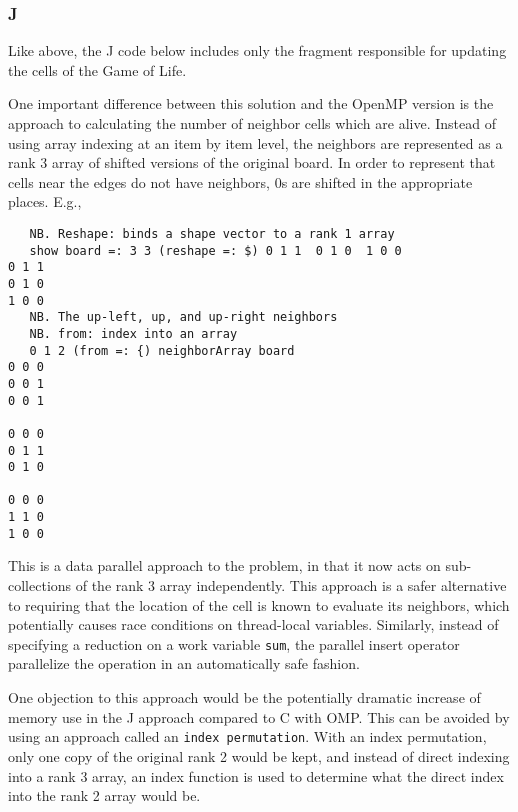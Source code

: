 \subsubsection{J}
Like above, the J code below includes only the fragment responsible for updating the cells of the Game of Life. 

\begin{singlespacing}
\begin{small}

\end{small}
\end{singlespacing}

One important difference between this solution and the OpenMP version is 
the approach to calculating the number of neighbor cells which are alive.
Instead of using array indexing at an item by item level, 
the neighbors are represented as a rank 3 array of shifted versions of the original board. 
In order to represent that cells near the edges do not have neighbors, 
0s are shifted in the appropriate places.
E.g.,

\begin{singlespacing}
\begin{small}
\begin{verbatim}
   NB. Reshape: binds a shape vector to a rank 1 array
   show board =: 3 3 (reshape =: $) 0 1 1  0 1 0  1 0 0
0 1 1
0 1 0
1 0 0
   NB. The up-left, up, and up-right neighbors
   NB. from: index into an array
   0 1 2 (from =: {) neighborArray board 
0 0 0
0 0 1
0 0 1

0 0 0
0 1 1
0 1 0

0 0 0
1 1 0
1 0 0
\end{verbatim}
\end{small}
\end{singlespacing}

This is a data parallel approach to the problem,
in that it now acts on sub-collections of the rank 3 array independently. 
This approach is a safer alternative to requiring 
that the location of the cell is known to evaluate its neighbors, 
which potentially causes race conditions on thread-local variables.
Similarly, instead of specifying a reduction on a work variable \texttt{sum},
the parallel insert operator parallelize the operation in an automatically safe fashion.

One objection to this approach would be the potentially dramatic increase 
of memory use in the J approach compared to C with OMP. 
This can be avoided by using an approach called an \texttt{index permutation}. %
With an index permutation, only one copy of the original rank 2 would be kept, 
and instead of direct indexing into a rank 3 array, 
an index function is used to determine 
what the direct index into the rank 2 array would be.

